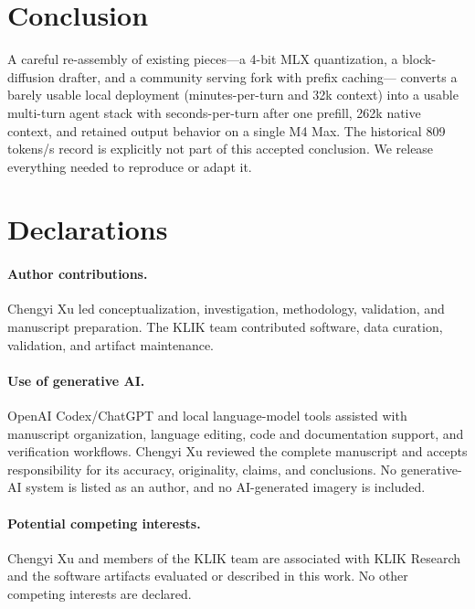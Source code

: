 \documentclass[11pt]{article}
\begin{document}
\section{Conclusion}
A careful re-assembly of existing pieces---a 4-bit MLX quantization, a
block-diffusion drafter, and a community serving fork with prefix caching---
converts a barely usable local deployment (minutes-per-turn and 32k context)
into a usable multi-turn agent stack with seconds-per-turn after one prefill,
262k native context, and retained output behavior on a single M4 Max. The
historical 809 tokens/s record is explicitly not part of this accepted conclusion. We release everything needed to reproduce or adapt it.

\section*{Declarations}
\paragraph{Author contributions.} Chengyi Xu led conceptualization, investigation, methodology, validation, and manuscript preparation. The KLIK team contributed software, data curation, validation, and artifact maintenance.
\paragraph{Use of generative AI.} OpenAI Codex/ChatGPT and local language-model tools assisted with manuscript organization, language editing, code and documentation support, and verification workflows. Chengyi Xu reviewed the complete manuscript and accepts responsibility for its accuracy, originality, claims, and conclusions. No generative-AI system is listed as an author, and no AI-generated imagery is included.
\paragraph{Potential competing interests.} Chengyi Xu and members of the KLIK team are associated with KLIK Research and the software artifacts evaluated or described in this work. No other competing interests are declared.
\end{document}
